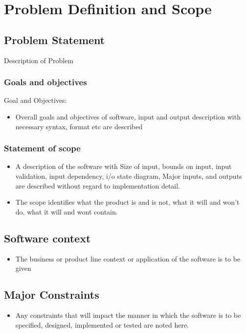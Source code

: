 \documentclass[oneside,a4paper,12pt]{report}
\begin{document}
\chapter{Problem Definition and Scope}
\section{Problem Statement}
Description of Problem


\subsection{Goals and objectives}  
Goal and Objectives: 
\begin{itemize}
  	\item Overall goals and objectives of software, input and output description with necessary syntax, format etc are described
\end{itemize}

 \subsection{Statement of scope} 
	\begin{itemize}  
	\item	A description of the software with Size of input, bounds on input, input validation, input dependency, i/o state diagram, Major inputs, and outputs are described without regard to implementation detail.
	\item The scope identifies what the product is and is not, what it will and won’t do, what it will and wont contain.
	\end{itemize}

\section{Software context} 
\begin{itemize}
\item The business or product line context or application of the software is to be given
\end{itemize}
\section{Major Constraints}
\begin{itemize}
\item Any constraints that will impact the manner in which the software is to be specified, designed, implemented or tested are noted here.
\end{itemize}
\end{document}
